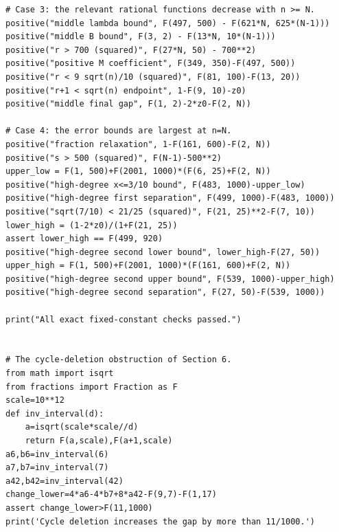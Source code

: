 \documentclass[11pt,a4paper]{article}
\theoremstyle{remark}\newtheorem{remark}[theorem]{Remark}
\begin{document}
\begin{lstlisting}
# Case 3: the relevant rational functions decrease with n >= N.
positive("middle lambda bound", F(497, 500) - F(621*N, 625*(N-1)))
positive("middle B bound", F(3, 2) - F(13*N, 10*(N-1)))
positive("r > 700 (squared)", F(27*N, 50) - 700**2)
positive("positive M coefficient", F(349, 350)-F(497, 500))
positive("r < 9 sqrt(n)/10 (squared)", F(81, 100)-F(13, 20))
positive("r+1 < sqrt(n) endpoint", 1-F(9, 10)-z0)
positive("middle final gap", F(1, 2)-2*z0-F(2, N))

# Case 4: the error bounds are largest at n=N.
positive("fraction relaxation", 1-F(161, 600)-F(2, N))
positive("s > 500 (squared)", F(N-1)-500**2)
upper_low = F(1, 500)+F(2001, 1000)*(F(6, 25)+F(2, N))
positive("high-degree x<=3/10 bound", F(483, 1000)-upper_low)
positive("high-degree first separation", F(499, 1000)-F(483, 1000))
positive("sqrt(7/10) < 21/25 (squared)", F(21, 25)**2-F(7, 10))
lower_high = (1-2*z0)/(1+F(21, 25))
assert lower_high == F(499, 920)
positive("high-degree second lower bound", lower_high-F(27, 50))
upper_high = F(1, 500)+F(2001, 1000)*(F(161, 600)+F(2, N))
positive("high-degree second upper bound", F(539, 1000)-upper_high)
positive("high-degree second separation", F(27, 50)-F(539, 1000))

print("All exact fixed-constant checks passed.")


# The cycle-deletion obstruction of Section 6.
from math import isqrt
from fractions import Fraction as F
scale=10**12
def inv_interval(d):
    a=isqrt(scale*scale//d)
    return F(a,scale),F(a+1,scale)
a6,b6=inv_interval(6)
a7,b7=inv_interval(7)
a42,b42=inv_interval(42)
change_lower=4*a6-4*b7+8*a42-F(9,7)-F(1,17)
assert change_lower>F(11,1000)
print('Cycle deletion increases the gap by more than 11/1000.')


\end{lstlisting}
\end{document}
